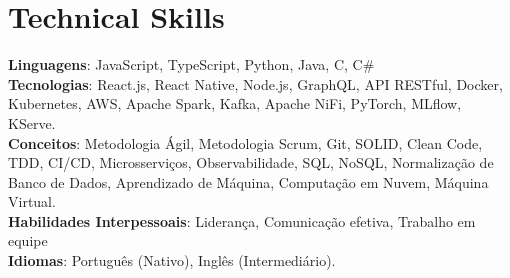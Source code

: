 \section{Technical Skills}
\begin{itemize}[leftmargin=0.15in, label={}]
	\small{\item{
	      \textbf{Linguagens}{: JavaScript, TypeScript, Python, Java, C, C\#} \\
	      \textbf{Tecnologias}{: React.js, React Native, Node.js, GraphQL, API RESTful, Docker, Kubernetes, AWS, Apache Spark, Kafka, Apache NiFi, PyTorch, MLflow, KServe.} \\
	      \textbf{Conceitos}{: Metodologia Ágil, Metodologia Scrum, Git, SOLID, Clean Code, TDD, CI/CD, Microsserviços, Observabilidade, SQL, NoSQL, Normalização de Banco de Dados, Aprendizado de Máquina, Computação em Nuvem, Máquina Virtual.}\\
	      \textbf{Habilidades Interpessoais}{: Liderança, Comunicação efetiva, Trabalho em equipe}\\
	      \textbf{Idiomas}{: Português (Nativo), Inglês (Intermediário).}
	      }}
\end{itemize}
